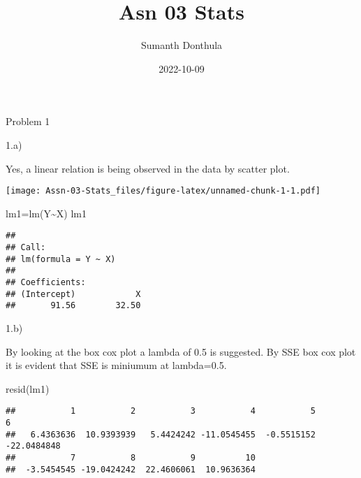 \documentclass[
]{article}
\title{Asn 03 Stats}
\author{Sumanth Donthula}
\date{2022-10-09}
\newenvironment{Shaded}{\begin{snugshade}}{\end{snugshade}}
\newcommand{\AttributeTok}[1]{\textcolor[rgb]{0.77,0.63,0.00}{#1}}
\newcommand{\ConstantTok}[1]{\textcolor[rgb]{0.00,0.00,0.00}{#1}}
\newcommand{\FunctionTok}[1]{\textcolor[rgb]{0.00,0.00,0.00}{#1}}
\newcommand{\NormalTok}[1]{#1}
\newcommand{\OtherTok}[1]{\textcolor[rgb]{0.56,0.35,0.01}{#1}}
\newcommand{\SpecialCharTok}[1]{\textcolor[rgb]{0.00,0.00,0.00}{#1}}
\newcommand{\StringTok}[1]{\textcolor[rgb]{0.31,0.60,0.02}{#1}}
\begin{document}
\maketitle

Problem 1

1.a)

Yes, a linear relation is being observed in the data by scatter plot.

\begin{Shaded}
\end{Shaded}

\texttt{[image: Assn-03-Stats\_files/figure-latex/unnamed-chunk-1-1.pdf]}

\begin{Shaded}
\begin{Highlighting}[]
\NormalTok{lm1}\OtherTok{=}\FunctionTok{lm}\NormalTok{(Y}\SpecialCharTok{\textasciitilde{}}\NormalTok{X)}
\NormalTok{lm1}
\end{Highlighting}
\end{Shaded}

\begin{verbatim}
## 
## Call:
## lm(formula = Y ~ X)
## 
## Coefficients:
## (Intercept)            X  
##       91.56        32.50
\end{verbatim}

1.b)

By looking at the box cox plot a lambda of 0.5 is suggested. By SSE box
cox plot it is evident that SSE is miniumum at lambda=0.5.

\begin{Shaded}
\begin{Highlighting}[]
\FunctionTok{resid}\NormalTok{(lm1)}
\end{Highlighting}
\end{Shaded}

\begin{verbatim}
##           1           2           3           4           5           6 
##   6.4363636  10.9393939   5.4424242 -11.0545455  -0.5515152 -22.0484848 
##           7           8           9          10 
##  -3.5454545 -19.0424242  22.4606061  10.9636364
\end{verbatim}
\end{document}
